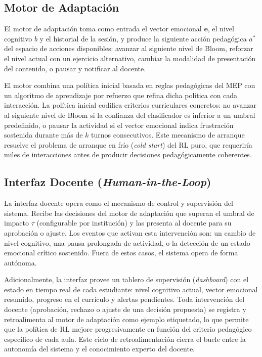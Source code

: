 \subsection{Motor de Adaptación}

El motor de adaptación toma como entrada el vector emocional $\mathbf{e}$,
el nivel cognitivo $b$ y el historial de la sesión, y produce la siguiente
acción pedagógica $a^{*}$ del espacio de acciones disponibles: avanzar al
siguiente nivel de Bloom, reforzar el nivel actual con un ejercicio
alternativo, cambiar la modalidad de presentación del contenido, o pausar y
notificar al docente.

El motor combina una política inicial basada en reglas pedagógicas del MEP
con un algoritmo de aprendizaje por refuerzo que refina dicha política con
cada interacción. La política inicial codifica criterios curriculares
concretos: no avanzar al siguiente nivel de Bloom si la confianza del
clasificador es inferior a un umbral predefinido, o pausar la actividad si
el vector emocional indica frustración sostenida durante más de $k$ turnos
consecutivos. Este mecanismo de arranque resuelve el problema de arranque
en frío (\textit{cold start}) del RL puro, que requeriría miles de
interacciones antes de producir decisiones pedagógicamente coherentes.

\subsection{Interfaz Docente (\textit{Human-in-the-Loop})}

La interfaz docente opera como el mecanismo de control y supervisión del
sistema. Recibe las decisiones del motor de adaptación que superan el umbral
de impacto $\tau$ (configurable por institución) y las presenta al docente
para su aprobación o ajuste. Los eventos que activan esta intervención son:
un cambio de nivel cognitivo, una pausa prolongada de actividad, o la
detección de un estado emocional crítico sostenido. Fuera de estos casos, el
sistema opera de forma autónoma.

Adicionalmente, la interfaz provee un tablero de supervisión (\textit{dashboard})
con el estado en tiempo real de cada estudiante: nivel cognitivo actual,
vector emocional resumido, progreso en el currículo y alertas pendientes.
Toda intervención del docente (aprobación, rechazo o ajuste de una decisión
propuesta) se registra y retroalimenta al motor de adaptación como ejemplo
etiquetado, lo que permite que la política de RL mejore progresivamente en
función del criterio pedagógico específico de cada aula. Este ciclo de
retroalimentación cierra el bucle entre la autonomía del sistema y el
conocimiento experto del docente.

